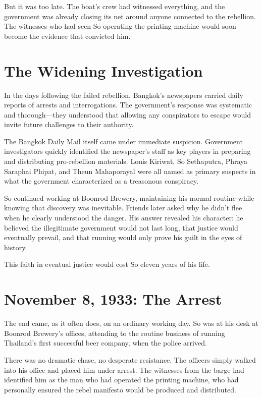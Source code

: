 \documentclass[
  Letterpaper,
]{scrbook}
\begin{document}
But it was too late. The boat's crew had witnessed everything, and the
government was already closing its net around anyone connected to the
rebellion. The witnesses who had seen So operating the printing machine
would soon become the evidence that convicted him.

\section{The Widening Investigation}\label{the-widening-investigation}

In the days following the failed rebellion, Bangkok's newspapers carried
daily reports of arrests and interrogations. The government's response
was systematic and thorough---they understood that allowing any
conspirators to escape would invite future challenges to their
authority.

The Bangkok Daily Mail itself came under immediate suspicion. Government
investigators quickly identified the newspaper's staff as key players in
preparing and distributing pro-rebellion materials. Louis Kiriwat, So
Sethaputra, Phraya Saraphai Phipat, and Theun Mahaporayal were all named
as primary suspects in what the government characterized as a treasonous
conspiracy.

So continued working at Boonrod Brewery, maintaining his normal routine
while knowing that discovery was inevitable. Friends later asked why he
didn't flee when he clearly understood the danger. His answer revealed
his character: he believed the illegitimate government would not last
long, that justice would eventually prevail, and that running would only
prove his guilt in the eyes of history.

This faith in eventual justice would cost So eleven years of his life.

\section{November 8, 1933: The Arrest}\label{november-8-1933-the-arrest}

The end came, as it often does, on an ordinary working day. So was at
his desk at Boonrod Brewery's offices, attending to the routine business
of running Thailand's first successful beer company, when the police
arrived.

There was no dramatic chase, no desperate resistance. The officers
simply walked into his office and placed him under arrest. The witnesses
from the barge had identified him as the man who had operated the
printing machine, who had personally ensured the rebel manifesto would
be produced and distributed.
\end{document}
